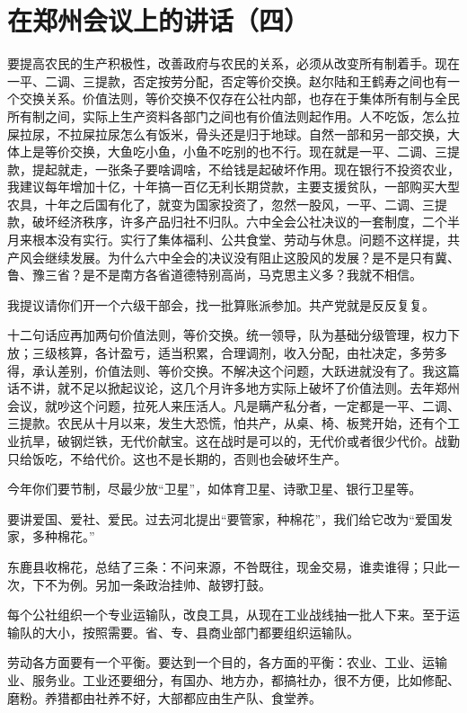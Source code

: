 \section[在郑州会议上的讲话（四）（一九五九年三月一日）]{在郑州会议上的讲话（四）}


要提高农民的生产积极性，改善政府与农民的关系，必须从改变所有制着手。现在一平、二调、三提款，否定按劳分配，否定等价交换。赵尔陆和王鹤寿之间也有一个交换关系。价值法则，等价交换不仅存在公社内部，也存在于集体所有制与全民所有制之间，实际上生产资料各部门之间也有价值法则起作用。人不吃饭，怎么拉屎拉尿，不拉屎拉尿怎么有饭米，骨头还是归于地球。自然一部和另一部交换，大体上是等价交换，大鱼吃小鱼，小鱼不吃别的也不行。现在就是一平、二调、三提款，提起就走，一张条子要啥调啥，不给钱是起破坏作用。现在银行不投资农业，我建议每年增加十亿，十年搞一百亿无利长期贷款，主要支援贫队，一部购买大型农具，十年之后国有化了，就变为国家投资了，忽然一股风，一平、二调、三提款，破坏经济秩序，许多产品归社不归队。六中全会公社决议的一套制度，二个半月来根本没有实行。实行了集体福利、公共食堂、劳动与休息。问题不这样提，共产风会继续发展。为什么六中全会的决议没有阻止这股风的发展？是不是只有冀、鲁、豫三省？是不是南方各省道德特别高尚，马克思主义多？我就不相信。

我提议请你们开一个六级干部会，找一批算账派参加。共产党就是反反复复。

十二句话应再加两句价值法则，等价交换。统一领导，队为基础分级管理，权力下放；三级核算，各计盈亏，适当积累，合理调剂，收入分配，由社决定，多劳多得，承认差别，价值法则、等价交换。不解决这个问题，大跃进就没有了。我这篇话不讲，就不足以掀起议论，这几个月许多地方实际上破坏了价值法则。去年郑州会议，就吵这个问题，拉死人来压活人。凡是瞒产私分者，一定都是一平、二调、三提款。农民从十月以来，发生大恐慌，怕共产，从桌、椅、板凳开始，还有个工业抗旱，破钢烂铁，无代价献宝。这在战时是可以的，无代价或者很少代价。战勤只给饭吃，不给代价。这也不是长期的，否则也会破坏生产。

今年你们要节制，尽最少放“卫星”，如体育卫星、诗歌卫星、银行卫星等。

要讲爱国、爱社、爱民。过去河北提出“要管家，种棉花”，我们给它改为“爱国发家，多种棉花。”

东鹿县收棉花，总结了三条：不问来源，不咎既往，现金交易，谁卖谁得；只此一次，下不为例。另加一条政治挂帅、敲锣打鼓。

每个公社组织一个专业运输队，改良工具，从现在工业战线抽一批人下来。至于运输队的大小，按照需要。省、专、县商业部门都要组织运输队。

劳动各方面要有一个平衡。要达到一个目的，各方面的平衡：农业、工业、运输业、服务业。工业还要细分，有国办、地方办，都搞社办，很不方便，比如修配、磨粉。养猎都由社养不好，大部都应由生产队、食堂养。

